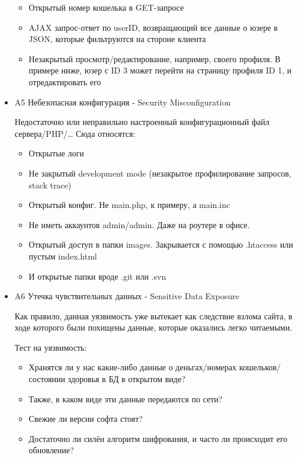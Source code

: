 \documentclass[11pt, a4paper]{article}		%
\begin{document}
\begin{itemize}
\begin{itemize}
\item Открытый номер кошелька в GET-запросе

\item AJAX запрос-ответ по userID, возвращающий все данные о юзере в JSON, которые фильтруются на стороне клиента

\item Незакрытый просмотр/редактирование, например, своего профиля. В примере ниже, юзер с ID 3 может перейти на страницу профиля ID 1, и отредактировать его

\end{itemize}

\item A5 Небезопасная конфигурация - Security Misconfiguration

Недостаточно или неправильно настроенный конфигурационный файл сервера/PHP/…
Сюда относятся:

\begin{itemize}
\item Открытые логи
\item Не закрытый development mode (незакрытое профилирование запросов, stack trace)
\item Открытый конфиг. Не main.php, к примеру, а main.inc
\item Не иметь аккаунтов admin/admin. Даже на роутере в офисе.
\item Открытый доступ в папки images. Закрывается с помощью .htaccess или пустым index.html
\item И открытые папки вроде .git или .svn
\end{itemize}

\item A6 Утечка чувствительных данных - Sensitive Data Exposure

Как правило, данная уязвимость уже вытекает как следствие взлома сайта, в ходе которого были похищены данные, которые оказались легко читаемыми.

Тест на уязвимость:
\begin{itemize}
\item Хранятся ли у нас какие-либо данные о деньгах/номерах кошельков/состоянии здоровья в БД в открытом виде?
\item Также, в каком виде эти данные передаются по сети?
\item Свежие ли версии софта стоят?
\item Достаточно ли силён алгоритм шифрования, и часто ли происходит его обновление?
\end{itemize}


\end{itemize}
\end{document}
